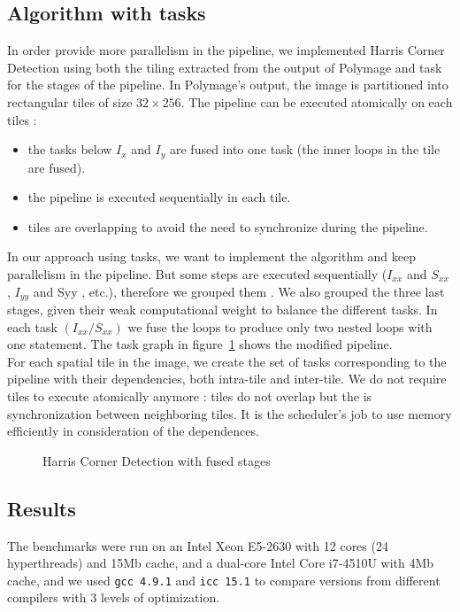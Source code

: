 \documentclass[a4paper,11pt]{article}
\begin{document}
\subsection{Algorithm with tasks}
In order provide more parallelism in the pipeline, we implemented Harris Corner Detection using 
both the tiling extracted from the output of Polymage and task for the stages
of the pipeline.
In Polymage's output, the image is partitioned into rectangular tiles of size $32 \times 256$.
The pipeline can be executed atomically on each tiles : 
\begin{itemize}
 \item the tasks below $I_x$ and $I_y$ are fused into one task (the inner loops in the tile
 are fused).
 \item the pipeline is executed sequentially in each tile.
 \item tiles are overlapping to avoid the need to synchronize during the pipeline.
\end{itemize}
In our approach using tasks, we want to implement the algorithm and keep 
parallelism in the pipeline. But some steps 
are executed sequentially ($I_{xx}$ and $S_{xx}$ , $I_{yy}$
and Syy , etc.), therefore we grouped them . We also grouped the three last
stages, given their weak computational weight to balance the different tasks. In each task
$(I_{xx} / S_{xx})$ we fuse the loops to produce only two nested loops with one statement. The
task graph in figure~\ref{fused_pipeline} shows the modified pipeline. \\
For each spatial tile in the image, we create the set of tasks corresponding to the pipeline
with their dependencies, both intra-tile and inter-tile. We do not require tiles to execute 
atomically anymore : tiles do not overlap but the is synchronization between neighboring tiles.
It is the scheduler’s job to use memory efficiently in consideration of the dependences.

\begin{figure}
\begin{center}
 
\end{center}
 \caption{Harris Corner Detection with fused stages}
 \label{fused_pipeline}
\end{figure}


\subsection{Results}
The benchmarks were run on an Intel Xeon E5-2630 with 12 cores (24 hyperthreads) and
15Mb cache, and a dual-core Intel Core i7-4510U with 4Mb cache, and we used \texttt{gcc 4.9.1}
and \texttt{icc 15.1} to compare versions from different compilers with 3 levels of optimization.
\end{document}
